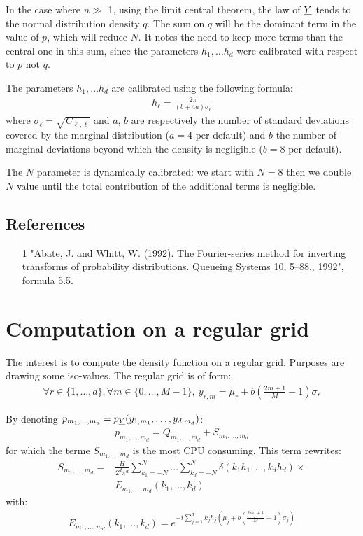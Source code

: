 In the case where $n \gg $ 1, using the limit central theorem, the law of ${\underline{Y}} $ tends to the normal distribution density $q$.
The sum on $q$ will be the dominant term in the value of $p$, which will reduce $N$.
It notes the need to keep more terms than the central one in this sum, since the parameters $ h_1, \dots  h_d$ were calibrated
with respect to $p$ not $q$.

The parameters $h_1, \dots  h_d$ are calibrated using the following formula:
\begin{align}
  h_\ell = \frac{2\pi}{(b+4a)\sigma_\ell}
\end{align}
where $\sigma_\ell=\sqrt{C_{\ell,\ell}}$ and $a$, $b$ are respectively the number of standard deviations covered by the marginal distribution
($a=4$ per default) and $b$ the number of marginal deviations beyond which the density is negligible ($b=8$ per default).

The $N$ parameter is dynamically calibrated: we start with $N=8$ then we double $N$ value until the total contribution of the additional terms is negligible.

\subsection{References}\label{ref}
\begin{itemize}
  \item[1] "Abate, J. and Whitt, W. (1992). The Fourier-series method for inverting transforms of probability distributions. Queueing Systems 10, 5--88., 1992",
        formula 5.5.
\end{itemize}

\section{Computation on a regular grid}

The interest is to compute the density function on a regular grid. Purposes are drawing some iso-values.
The regular grid is of form:
\begin{align}
  \forall r\in\{1,\hdots,d\},\forall m\in\{0,\hdots,M-1\},\:y_{r,m}=\mu_r+b\left(\frac{2m+1}{M} - 1\right)\sigma_r
\end{align}

By denoting $p_{m_1,\hdots,m_d}=p_{{\underline{Y}}}(y_{1,m_1},\hdots,y_{d,m_d})$:
\begin{align}
  p_{m_1,\hdots,m_d}= Q_{m_1,\hdots,m_d}+S_{m_1,\hdots,m_d}
\end{align}
for which the terme $S_{m_1,\hdots,m_d}$ is the most CPU consuming. This term rewrites:
\begin{align}
S_{m_1,\hdots,m_d}=&\frac{H}{2^d\pi^d}\sum_{k_1=-N}^{N}\hdots\sum_{k_d=-N}^{N}\delta\left(k_1h_1,\hdots,k_dh_d\right)\times\nonumber\\
&E_{m_1,\hdots,m_d}(k_1,\hdots,k_d)
\end{align}
with:
\begin{align}
  E_{m_1,\hdots,m_d}(k_1,\hdots,k_d)=e^{-i\sum_{j=1}^d k_jh_j\left(\mu_j+b\left(\frac{2m_j+1}{M}-1\right)\sigma_j\right)}
\end{align}

